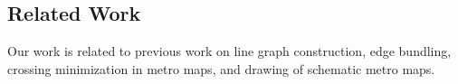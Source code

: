 \documentclass[format=acmsmall, review=false, screen=true]{acmart}
\begin{document}
%
%
%
%

%
\subsection{Related Work}\label{SEC:related}
%
Our work is related to previous work on line graph construction, edge bundling, crossing minimization in metro maps, and drawing of schematic metro maps.
\end{document}
